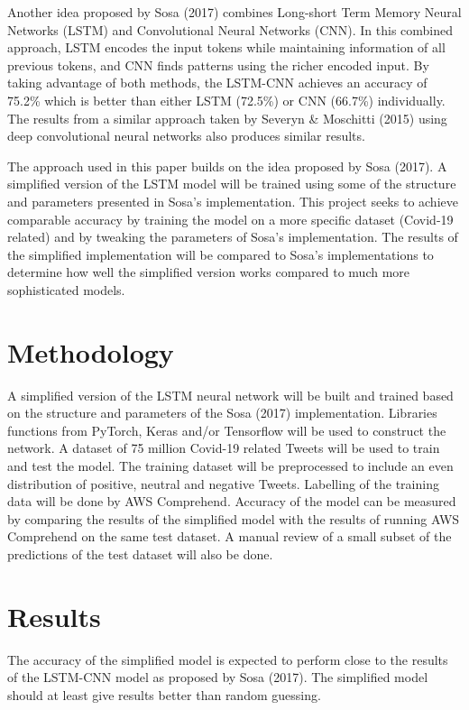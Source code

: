 \documentclass[letterpaper]{article} %
\begin{document}
Another idea proposed by Sosa (2017) combines Long-short Term Memory Neural Networks (LSTM) and Convolutional Neural Networks (CNN). In this combined approach, LSTM encodes the input tokens while maintaining information of all previous tokens, and CNN finds patterns using the richer encoded input. By taking advantage of both methods, the LSTM-CNN achieves an accuracy of 75.2\% which is better than either LSTM (72.5\%) or CNN (66.7\%) individually. The results from a similar approach taken by Severyn \&  Moschitti  (2015) using deep convolutional neural networks also produces similar results.

The approach used in this paper builds on the idea proposed by Sosa (2017). A simplified version of the LSTM model will be trained using some of the structure and parameters presented in Sosa's implementation. This project seeks to achieve comparable accuracy by training the model on a more specific dataset (Covid-19 related) and by tweaking the parameters of Sosa's implementation. The results of the simplified implementation will be compared to Sosa's implementations to determine how well the simplified version works compared to much more sophisticated models.



\section{Methodology}

A simplified version of the LSTM neural network will be built and trained based on the structure and parameters of the Sosa (2017) implementation. Libraries functions from PyTorch, Keras and/or Tensorflow will be used to construct the network. A dataset of 75 million Covid-19 related Tweets will be used to train and test the model. The training dataset will be preprocessed to include an even distribution of positive, neutral and negative Tweets. Labelling of the training data will be done by AWS Comprehend. Accuracy of the model can be measured by comparing the results of the simplified model with the results of running AWS Comprehend on the same test dataset. A manual review of a small subset of the predictions of the test dataset will also be done.


\section{Results}

The accuracy of the simplified model is expected to perform close to the results of the LSTM-CNN model as proposed by Sosa (2017). The simplified model should at least give results better than random guessing.

\newpage
\nocite{*}


\end{document}
